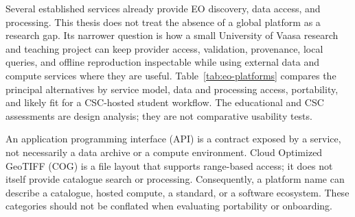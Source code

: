 Several established services already provide EO discovery, data access, and processing. This
thesis does not treat the absence of a global platform as a research gap. Its narrower question
is how a small University of Vaasa research and teaching project can keep provider access,
validation, provenance, local queries, and offline reproduction inspectable while using external
data and compute services where they are useful. Table~\ref{tab:eo-platforms} compares the
principal alternatives by service model, data and processing access, portability, and likely
fit for a CSC-hosted student workflow. The educational and CSC assessments are design analysis;
they are not comparative usability tests.

An application programming interface (API) is a contract exposed by a service, not necessarily
a data archive or a compute environment. Cloud Optimized GeoTIFF (COG) is a file layout that
supports range-based access; it does not itself provide catalogue search or processing.
Consequently, a platform name can describe a catalogue, hosted compute, a standard, or a
software ecosystem. These categories should not be conflated when evaluating portability or
onboarding.

